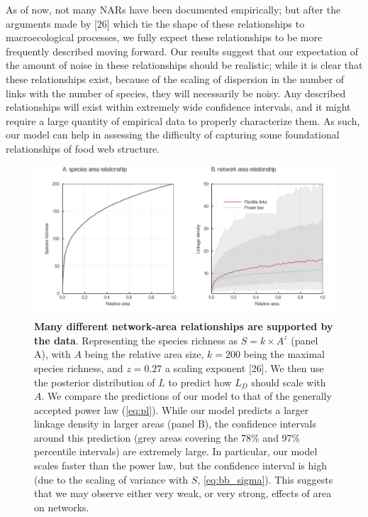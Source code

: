 \documentclass[12pt]{article}
\begin{document}
As of now, not many NARs have been documented empirically; but after the
arguments made by {[}26{]} which tie the shape of these relationships to
macroecological processes, we fully expect these relationships to be
more frequently described moving forward. Our results suggest that our
expectation of the amount of noise in these relationships should be
realistic; while it is clear that these relationships exist, because of
the scaling of dispersion in the number of links with the number of
species, they will necessarily be noisy. Any described relationships
will exist within extremely wide confidence intervals, and it might
require a large quantity of empirical data to properly characterize
them. As such, our model can help in assessing the difficulty of
capturing some foundational relationships of food web structure.

\begin{figure}
\hypertarget{fig:nar}{%
\centering
\includegraphics{figures/nar.png}
\caption{\textbf{Many different network-area relationships are supported
by the data}. Representing the species richness as \(S = k\times A^z\)
(panel A), with \(A\) being the relative area size, \(k = 200\) being
the maximal species richness, and \(z = 0.27\) a scaling exponent
{[}26{]}. We then use the posterior distribution of \(L\) to predict how
\(L_D\) should scale with \(A\). We compare the predictions of our model
to that of the generally accepted power law (\cref{eq:pl}). While our
model predicts a larger linkage density in larger areas (panel B), the
confidence intervals around this prediction (grey areas covering the
78\% and 97\% percentile intervals) are extremely large. In particular,
our model scales faster than the power law, but the confidence interval
is high (due to the scaling of variance with \(S\), \cref{eq:bb_sigma}).
This suggests that we may observe either very weak, or very strong,
effects of area on networks.}\label{fig:nar}
}
\end{figure}
\end{document}
